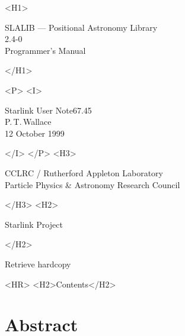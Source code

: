 \documentclass[11pt,twoside]{article}
\newcommand{\stardoccategory}  {Starlink User Note}
\newcommand{\stardocsource}    {sun67.45}
\newcommand{\stardocnumber}    {67.45}
\newcommand{\stardocauthors}   {P.\,T.\,Wallace}
\newcommand{\stardocdate}      {12 October 1999}
\newcommand{\stardoctitle}     {SLALIB --- Positional Astronomy Library}
\newcommand{\stardocversion}   {2.4-0}
\newcommand{\stardocmanual}    {Programmer's Manual}
\newcommand{\htmladdnormallink}[2]{#1}
\newcommand{\htmladdimg}[1]{}
\newcommand{\htmlref}[2]{#1}
\newcommand{\htmladdtonavigation}[1]{}
\newcommand{\xlabel}[1]{}
\newcommand{\latexonlytoc}[0]{\tableofcontents}
\begin{document}
\begin{htmlonly}
   \xlabel{}
   \begin{rawhtml} <H1> \end{rawhtml}
      \stardoctitle\\
      \stardocversion\\
      \stardocmanual
   \begin{rawhtml} </H1> \end{rawhtml}


   \begin{rawhtml} <P> <I> \end{rawhtml}
   \stardoccategory \stardocnumber \\
   \stardocauthors \\
   \stardocdate
   \begin{rawhtml} </I> </P> <H3> \end{rawhtml}
      \htmladdnormallink{CCLRC}{http://www.cclrc.ac.uk} /
      \htmladdnormallink{Rutherford Appleton Laboratory}
                        {http://www.cclrc.ac.uk/ral} \\
      \htmladdnormallink{Particle Physics \& Astronomy Research Council}
                        {http://www.pparc.ac.uk} \\
   \begin{rawhtml} </H3> <H2> \end{rawhtml}
      \htmladdnormallink{Starlink Project}{http://star-www.rl.ac.uk/}
   \begin{rawhtml} </H2> \end{rawhtml}
   \htmladdnormallink{\htmladdimg{source.gif} Retrieve hardcopy}
      {http://star-www.rl.ac.uk/cgi-bin/hcserver?\stardocsource}\\

  \label{stardoccontents}
  \begin{rawhtml}
    <HR>
    <H2>Contents</H2>
  \end{rawhtml}
  \renewcommand{\latexonlytoc}[0]{}
  \htmladdtonavigation{\htmlref{\htmladdimg{contents_motif.gif}}
        {stardoccontents}}

  \section{\xlabel{abstract}Abstract}
\end{htmlonly}
\end{document}
